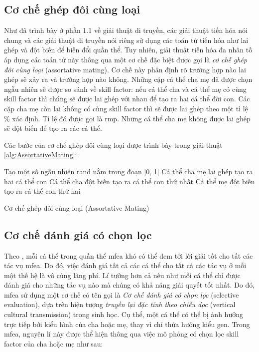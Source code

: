 \subsection{Cơ chế ghép đôi cùng loại} \label{chap_coso:sec_mfea:subsec:cocheghepdoi}
Như đã trình bày ở phần 1.1 về giải thuật di truyền, các giải thuật tiến hóa nói chung và các giải thuật di truyền nói riêng sử dụng các toán tử tiến hóa như lai ghép và đột biến để biến đổi quần thể. Tuy nhiên, giải thuật tiến hóa đa nhân tố áp dụng các toán tử này thông qua một cơ chế đặc biệt được gọi là \textit{cơ chế ghép đôi cùng loại} (assortative mating). Cơ chế này phân định rõ trường hợp nào lai ghép sẽ xảy ra và trường hợp nào không. Những cặp cá thể cha mẹ đã được chọn ngẫu nhiên sẽ được so sánh về skill factor: nếu cá thể cha và cá thể mẹ có cùng skill factor thì chúng sẽ được lai ghép với nhau để tạo ra hai cá thể đời con. Các cặp cha mẹ còn lại không có cùng skill factor thì sẽ được lai ghép theo một tỉ lệ \% xác định. Tỉ lệ đó được gọi là \gls{rmp}. Những cá thể cha mẹ không được lai ghép sẽ đột biến để tạo ra các cá thể.

Các bước của cơ chế ghép đôi cùng loại được trình bày trong giải thuật \ref{alg:AssortativeMating}:
\begin{algorithm}[htb]
	\Begin
	{	
		Tạo một số ngẫu nhiên rand nằm trong đoạn [0, 1]\;
		{
			Cá thể cha mẹ lai ghép tạo ra hai cá thể con\;
		}
		\Else
		{
			Cá thể cha đột biến tạo ra cá thể con thứ nhất\;
			Cá thể mẹ đột biến tạo ra cá thể con thứ hai\;
		}
	
	}
	\caption{Cơ chế ghép đôi cùng loại (Assortative Mating)}
	\label{alg:AssortativeMating}
\end{algorithm}


\subsection{Cơ chế đánh giá có chọn lọc} \label{chap_coso:sec_mfea:subsec:cochedanhgiachonloc}
Theo \cite{gupta_multifactorial_2016}, mỗi cá thể trong quần thể \gls{mfea} khó có thể đem tới lời giải tốt cho tất các tác vụ \gls{mfea}. Do đó, việc đánh giá tất cả các cá thể cho tất cả các tác vụ ở mỗi một thế hệ là vô cùng lãng phí. Lí tưởng hơn cả nếu như mỗi cá thể chỉ được đánh giá cho những tác vụ nào mà chúng có khả năng giải quyết tốt nhất. Do đó, \gls{mfea} sử dụng một cơ chế có tên gọi là \textit{Cơ chế đánh giá có chọn lọc} (selective evaluation), dựa trên hiện tượng \textit{truyền lại đặc tính theo chiều dọc} (vertical cultural transmission) trong sinh học. Cụ thể, một cá thể có thể bị ảnh hưởng trực tiếp bởi kiểu hình của cha hoặc mẹ, thay vì chỉ thừa hưởng kiểu gen. Trong \gls{mfea}, nguyên lí này được thể hiện thông qua việc mô phỏng có chọn lọc skill factor của cha hoặc mẹ như sau: 

